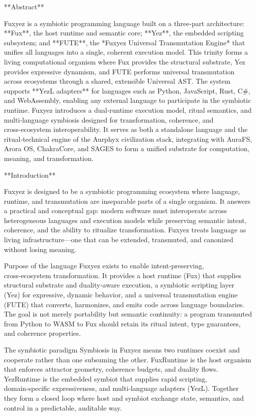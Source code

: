 **Abstract**

Fuxyez is a symbiotic programming language built on a three‑part architecture: **Fux**, the host runtime and semantic core; **Yez**, the embedded scripting subsystem; and **FUTE**, the *Fuxyez Universal Transmutation Engine* that unifies all languages into a single, coherent execution model. This trinity forms a living computational organism where Fux provides the structural substrate, Yez provides expressive dynamism, and FUTE performs universal transmutation across ecosystems through a shared, extensible Universal AST. The system supports **YezL adapters** for languages such as Python, JavaScript, Rust, C#, and WebAssembly, enabling any external language to participate in the symbiotic runtime. Fuxyez introduces a dual‑runtime execution model, ritual semantics, and multi‑language symbiosis designed for transformation, coherence, and cross‑ecosystem interoperability. It serves as both a standalone language and the ritual‑technical engine of the Aurphyx civilization stack, integrating with AuraFS, Arora OS, ChakraCore, and SAGES to form a unified substrate for computation, meaning, and transformation.

**Introduction**

Fuxyez is designed to be a symbiotic programming ecosystem where language, runtime, and transmutation are inseparable parts of a single organism. It answers a practical and conceptual gap: modern software must interoperate across heterogeneous languages and execution models while preserving semantic intent, coherence, and the ability to ritualize transformation. Fuxyez treats language as living infrastructure—one that can be extended, transmuted, and canonized without losing meaning.

Purpose of the language
Fuxyez exists to enable intent‑preserving, cross‑ecosystem transformation. It provides a host runtime (Fux) that supplies structural substrate and duality‑aware execution, a symbiotic scripting layer (Yez) for expressive, dynamic behavior, and a universal transmutation engine (FUTE) that converts, harmonizes, and emits code across language boundaries. The goal is not merely portability but semantic continuity: a program transmuted from Python to WASM to Fux should retain its ritual intent, type guarantees, and coherence properties.

The symbiotic paradigm
Symbiosis in Fuxyez means two runtimes coexist and cooperate rather than one subsuming the other. FuxRuntime is the host organism that enforces attractor geometry, coherence budgets, and duality flows. YezRuntime is the embedded symbiot that supplies rapid scripting, domain‑specific expressiveness, and multi‑language adapters (YezL). Together they form a closed loop where host and symbiot exchange state, semantics, and control in a predictable, auditable way.

